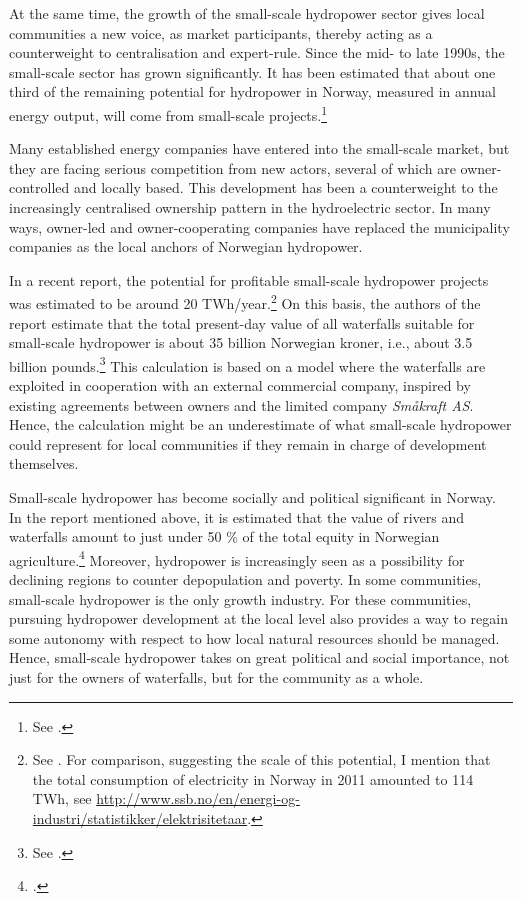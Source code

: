 At the same time, the growth of the small-scale hydropower sector gives local communities a new voice, as market participants, thereby acting as a counterweight to centralisation and expert-rule. Since the mid- to late 1990s, the small-scale sector has grown significantly. It has been estimated that about one third of the remaining potential for hydropower in Norway, measured in annual energy output, will come from small-scale projects.\footnote{See \cite[231]{nou129}.}

Many established energy companies have entered into the small-scale market, but they are facing serious competition from new actors, several of which are  owner-controlled and locally based. This development has been a counterweight to the increasingly centralised ownership pattern in the hydroelectric sector. In many ways, owner-led and owner-cooperating companies have replaced the municipality companies as the local anchors of Norwegian hydropower.

In a recent report, the potential for profitable small-scale hydropower projects was estimated to be around 20 TWh/year.\footnote{See \cite{aanesland09}. For comparison, suggesting the scale of this potential, I mention that the total consumption of electricity in Norway in 2011 amounted to 114 TWh, see \url{http://www.ssb.no/en/energi-og-industri/statistikker/elektrisitetaar}.} On this basis, the authors of the report estimate that the total present-day value of all waterfalls suitable for small-scale hydropower is about 35 billion Norwegian kroner, i.e., about 3.5 billion pounds.\footnote{See \cite[1]{aanesland09}.} This calculation is based on a model where the waterfalls are exploited in cooperation with an external commercial company, inspired by existing agreements between owners and the limited company {\it Småkraft AS}. Hence, the calculation might be an underestimate of what small-scale hydropower could represent for local communities if they remain in charge of development themselves.

Small-scale hydropower has become socially and political significant in Norway. In the report mentioned above, it is estimated that the value of rivers and waterfalls amount to just under 50 \% of the total equity in Norwegian agriculture.\footcite[1]{aanesland09} Moreover, hydropower is increasingly seen as a possibility for declining regions to counter depopulation and poverty. In some communities, small-scale hydropower is the only growth industry. For these communities, pursuing hydropower development at the local level also provides a way to regain some autonomy with respect to how local natural resources should be managed. Hence, small-scale hydropower takes on great political and social importance, not just for the owners of waterfalls, but for the community as a whole.


